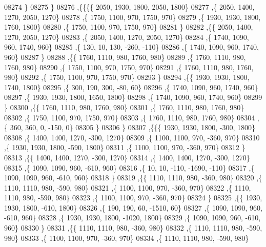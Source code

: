 \begin{DoxyCode}
08274    \}
08275   \}
08276  ,\{\{\{\{  2050,  1930,  1800,  2050,  1800\}
08277     ,\{  2050,  1400,  1270,  2050,  1270\}
08278     ,\{  1750,  1100,   970,  1750,   970\}
08279     ,\{  1930,  1930,  1800,  1760,  1800\}
08280     ,\{  1750,  1100,   970,  1750,   970\}
08281     \}
08282    ,\{\{  2050,  1400,  1270,  2050,  1270\}
08283     ,\{  2050,  1400,  1270,  2050,  1270\}
08284     ,\{  1740,  1090,   960,  1740,   960\}
08285     ,\{   130,    10,   130,  -260,  -110\}
08286     ,\{  1740,  1090,   960,  1740,   960\}
08287     \}
08288    ,\{\{  1760,  1110,   980,  1760,   980\}
08289     ,\{  1760,  1110,   980,  1760,   980\}
08290     ,\{  1750,  1100,   970,  1750,   970\}
08291     ,\{  1760,  1110,   980,  1760,   980\}
08292     ,\{  1750,  1100,   970,  1750,   970\}
08293     \}
08294    ,\{\{  1930,  1930,  1800,  1740,  1800\}
08295     ,\{   300,   190,   300,   -80,    60\}
08296     ,\{  1740,  1090,   960,  1740,   960\}
08297     ,\{  1930,  1930,  1800,  1650,  1800\}
08298     ,\{  1740,  1090,   960,  1740,   960\}
08299     \}
08300    ,\{\{  1760,  1110,   980,  1760,   980\}
08301     ,\{  1760,  1110,   980,  1760,   980\}
08302     ,\{  1750,  1100,   970,  1750,   970\}
08303     ,\{  1760,  1110,   980,  1760,   980\}
08304     ,\{   360,   360,     0,  -150,     0\}
08305     \}
08306    \}
08307   ,\{\{\{  1930,  1930,  1800,  -300,  1800\}
08308     ,\{  1400,  1400,  1270,  -300,  1270\}
08309     ,\{  1100,  1100,   970,  -360,   970\}
08310     ,\{  1930,  1930,  1800,  -590,  1800\}
08311     ,\{  1100,  1100,   970,  -360,   970\}
08312     \}
08313    ,\{\{  1400,  1400,  1270,  -300,  1270\}
08314     ,\{  1400,  1400,  1270,  -300,  1270\}
08315     ,\{  1090,  1090,   960,  -610,   960\}
08316     ,\{    10,    10,  -110, -1690,  -110\}
08317     ,\{  1090,  1090,   960,  -610,   960\}
08318     \}
08319    ,\{\{  1110,  1110,   980,  -360,   980\}
08320     ,\{  1110,  1110,   980,  -590,   980\}
08321     ,\{  1100,  1100,   970,  -360,   970\}
08322     ,\{  1110,  1110,   980,  -590,   980\}
08323     ,\{  1100,  1100,   970,  -360,   970\}
08324     \}
08325    ,\{\{  1930,  1930,  1800,  -610,  1800\}
08326     ,\{   190,   190,    60, -1510,    60\}
08327     ,\{  1090,  1090,   960,  -610,   960\}
08328     ,\{  1930,  1930,  1800, -1020,  1800\}
08329     ,\{  1090,  1090,   960,  -610,   960\}
08330     \}
08331    ,\{\{  1110,  1110,   980,  -360,   980\}
08332     ,\{  1110,  1110,   980,  -590,   980\}
08333     ,\{  1100,  1100,   970,  -360,   970\}
08334     ,\{  1110,  1110,   980,  -590,   980\}

\end{DoxyCode}
